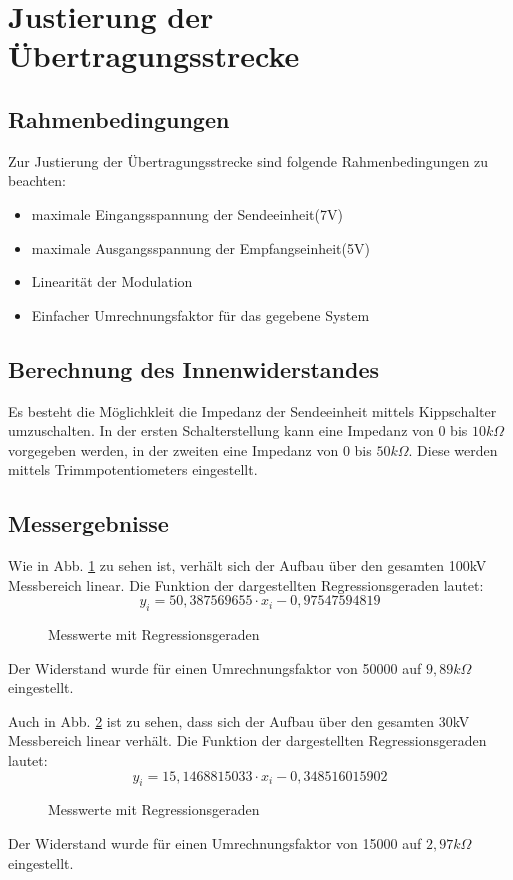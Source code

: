 \section{Justierung der Übertragungsstrecke}
\subsection{Rahmenbedingungen}
Zur Justierung der Übertragungsstrecke sind folgende Rahmenbedingungen zu beachten:
\begin{itemize}
\item maximale Eingangsspannung der Sendeeinheit(7V)
\item maximale Ausgangsspannung der Empfangseinheit(5V)
\item Linearität der Modulation
\item Einfacher Umrechnungsfaktor für das gegebene System
\end{itemize}

\subsection{Berechnung des Innenwiderstandes}
Es besteht die Möglichkleit die Impedanz der Sendeeinheit mittels Kippschalter umzuschalten. In der ersten Schalterstellung kann eine Impedanz von 0 bis $10k\Omega$ vorgegeben werden, in der zweiten eine Impedanz von 0 bis $50k\Omega$. Diese werden mittels Trimmpotentiometers eingestellt. 
\subsection{Messergebnisse}
Wie in Abb. \ref{fig:9k89} zu sehen ist, verhält sich der Aufbau über den gesamten 100kV Messbereich linear. Die Funktion der dargestellten Regressionsgeraden lautet:
\begin{equation}
y_i = 50,387569655 \cdot x_i - 0,97547594819
\label{math:regress100kV}
\end{equation} 
  	\begin{figure}[H]
		
		\caption{Messwerte mit Regressionsgeraden}
			\label{fig:9k89}
		\end{figure}
		Der Widerstand wurde für einen Umrechnungsfaktor von 50000 auf $9,89k\Omega$ eingestellt.
		\begin{figure}[H]
	
	\end{figure}
Auch in Abb. \ref{fig:2k97} ist zu sehen, dass sich der Aufbau über den gesamten 30kV Messbereich linear verhält. Die Funktion der dargestellten Regressionsgeraden lautet:
	\begin{equation}
	y_i = 15,1468815033 \cdot x_i - 0,348516015902
	\label{math:regress30kV}
	\end{equation} 
	\begin{figure}[H]
		
		\caption{Messwerte mit Regressionsgeraden}
			\label{fig:2k97}
		\end{figure}
				Der Widerstand wurde für einen Umrechnungsfaktor von 15000 auf $2,97k\Omega$ eingestellt.
		\begin{figure}[H]
	
	\end{figure}

